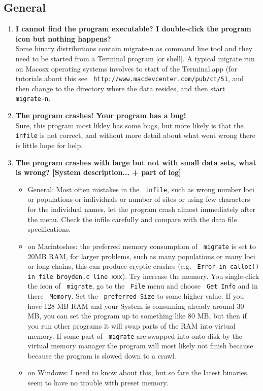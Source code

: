 \subsection{General}
\begin{enumerate}
\item {\bfseries  I cannot find the program executable? I double-click the program icon but nothing happens?}\\
Some binary distributions contain migrate-n as command line tool and they
need to be started from a Terminal program [or shell]. A typical migrate run on Macosx  operating systems involves to start of the Terminal.app (for tutorials
about this see \texttt{ http://www.macdevcenter.com/pub/ct/51}, and then 
change to the directory where the data resides, and then start \texttt{ migrate-n}.
\item {\bfseries The program crashes! Your program has a bug!}\\
Sure, this program most likley has some bugs, but more likely is that
the \texttt{ infile} is not correct, and without more detail about 
what went wrong there is 
little hope for help. 
\item {\bfseries The program crashes with large but not with small data sets, 
what is wrong? [System description... + part of log]}
\begin{itemize}
\item General: Most often mistakes in the \texttt{ infile}, such as wrong number
loci or populations or individuals or number of sites or using few characters for the individual names, let the program crash almost immediately after the 
menu. Check the infile carefully and compare with the data file specifications.
\item on Macintoshes: the preferred memory consumption of \texttt{ migrate} is set to 20MB RAM, for larger problems, such as many populations or 
many loci or long chains, this can produce cryptic crashes (e.g. 
\texttt{ Error in calloc() in file broyden.c line xxx}). Try increase the memory.
You single-click the icon of \texttt{ migrate}, go to the \texttt{ File} menu and 
choose \texttt{ Get Info} and in there \texttt{ Memory}. Set the \texttt{ preferred Size}
to some higher value. If you have 128 MB RAM and your System is 
consuming already around 30 MB, you can set the program up to something like 
80 MB, but then if you run other programs it will swap parts of the RAM into
virtual memory. If some part of \texttt{ migrate} are swapped into onto disk
by the virtual memory manager the program will most likely not finish because
because the program is slowed down to a crawl.
\item on Windows: I need to know about this, but so fare the latest binaries,
seem to have no trouble with preset memory.
\end{itemize}
\end{enumerate}
